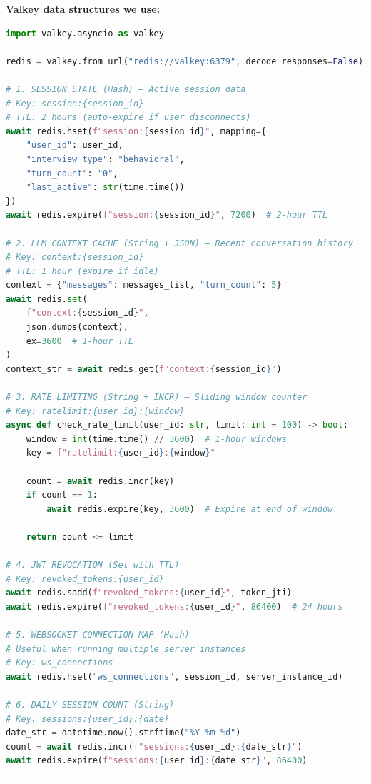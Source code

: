 \documentclass[
  11pt,
]{article}
\begin{document}
\textbf{Valkey data structures we use:}

\begin{lstlisting}[language=Python]
import valkey.asyncio as valkey

redis = valkey.from_url("redis://valkey:6379", decode_responses=False)

# 1. SESSION STATE (Hash) — Active session data
# Key: session:{session_id}
# TTL: 2 hours (auto-expire if user disconnects)
await redis.hset(f"session:{session_id}", mapping={
    "user_id": user_id,
    "interview_type": "behavioral",
    "turn_count": "0",
    "last_active": str(time.time())
})
await redis.expire(f"session:{session_id}", 7200)  # 2-hour TTL

# 2. LLM CONTEXT CACHE (String + JSON) — Recent conversation history
# Key: context:{session_id}  
# TTL: 1 hour (expire if idle)
context = {"messages": messages_list, "turn_count": 5}
await redis.set(
    f"context:{session_id}", 
    json.dumps(context), 
    ex=3600  # 1-hour TTL
)
context_str = await redis.get(f"context:{session_id}")

# 3. RATE LIMITING (String + INCR) — Sliding window counter
# Key: ratelimit:{user_id}:{window}
async def check_rate_limit(user_id: str, limit: int = 100) -> bool:
    window = int(time.time() // 3600)  # 1-hour windows
    key = f"ratelimit:{user_id}:{window}"
    
    count = await redis.incr(key)
    if count == 1:
        await redis.expire(key, 3600)  # Expire at end of window
    
    return count <= limit

# 4. JWT REVOCATION (Set with TTL)
# Key: revoked_tokens:{user_id}
await redis.sadd(f"revoked_tokens:{user_id}", token_jti)
await redis.expire(f"revoked_tokens:{user_id}", 86400)  # 24 hours

# 5. WEBSOCKET CONNECTION MAP (Hash)
# Useful when running multiple server instances
# Key: ws_connections
await redis.hset("ws_connections", session_id, server_instance_id)

# 6. DAILY SESSION COUNT (String)
# Key: sessions:{user_id}:{date}
date_str = datetime.now().strftime("%Y-%m-%d")
count = await redis.incr(f"sessions:{user_id}:{date_str}")
await redis.expire(f"sessions:{user_id}:{date_str}", 86400)
\end{lstlisting}

\begin{center}\rule{0.5\linewidth}{0.5pt}\end{center}
\end{document}
